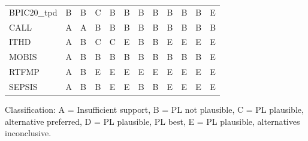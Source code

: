 \begin{tabular}{llllllllllll}
BPIC20\_tpd & \cellcolor[HTML]{D55E00} B & \cellcolor[HTML]{D55E00} B & \cellcolor[HTML]{E69F00} C & \cellcolor[HTML]{D55E00} B & \cellcolor[HTML]{D55E00} B & \cellcolor[HTML]{D55E00} B & \cellcolor[HTML]{D55E00} B & \cellcolor[HTML]{D55E00} B & \cellcolor[HTML]{D55E00} B & \cellcolor[HTML]{D55E00} B & \cellcolor[HTML]{56B4E9} E \\
       CALL & \cellcolor[HTML]{FFFFFF} A & \cellcolor[HTML]{FFFFFF} A & \cellcolor[HTML]{D55E00} B & \cellcolor[HTML]{D55E00} B & \cellcolor[HTML]{D55E00} B & \cellcolor[HTML]{D55E00} B & \cellcolor[HTML]{D55E00} B & \cellcolor[HTML]{D55E00} B & \cellcolor[HTML]{D55E00} B & \cellcolor[HTML]{D55E00} B & \cellcolor[HTML]{D55E00} B \\
       ITHD & \cellcolor[HTML]{FFFFFF} A & \cellcolor[HTML]{D55E00} B & \cellcolor[HTML]{E69F00} C & \cellcolor[HTML]{E69F00} C & \cellcolor[HTML]{56B4E9} E & \cellcolor[HTML]{D55E00} B & \cellcolor[HTML]{D55E00} B & \cellcolor[HTML]{56B4E9} E & \cellcolor[HTML]{56B4E9} E & \cellcolor[HTML]{56B4E9} E & \cellcolor[HTML]{56B4E9} E \\
      MOBIS & \cellcolor[HTML]{FFFFFF} A & \cellcolor[HTML]{D55E00} B & \cellcolor[HTML]{D55E00} B & \cellcolor[HTML]{D55E00} B & \cellcolor[HTML]{D55E00} B & \cellcolor[HTML]{D55E00} B & \cellcolor[HTML]{D55E00} B & \cellcolor[HTML]{D55E00} B & \cellcolor[HTML]{D55E00} B & \cellcolor[HTML]{D55E00} B & \cellcolor[HTML]{56B4E9} E \\
      RTFMP & \cellcolor[HTML]{FFFFFF} A & \cellcolor[HTML]{D55E00} B & \cellcolor[HTML]{56B4E9} E & \cellcolor[HTML]{56B4E9} E & \cellcolor[HTML]{56B4E9} E & \cellcolor[HTML]{56B4E9} E & \cellcolor[HTML]{56B4E9} E & \cellcolor[HTML]{56B4E9} E & \cellcolor[HTML]{56B4E9} E & \cellcolor[HTML]{56B4E9} E & \cellcolor[HTML]{56B4E9} E \\
     SEPSIS & \cellcolor[HTML]{FFFFFF} A & \cellcolor[HTML]{D55E00} B & \cellcolor[HTML]{D55E00} B & \cellcolor[HTML]{56B4E9} E & \cellcolor[HTML]{56B4E9} E & \cellcolor[HTML]{D55E00} B & \cellcolor[HTML]{D55E00} B & \cellcolor[HTML]{56B4E9} E & \cellcolor[HTML]{56B4E9} E & \cellcolor[HTML]{56B4E9} E & \cellcolor[HTML]{56B4E9} E \\
\bottomrule
\end{tabular}
\begin{center}\footnotesize
Classification: A = Insufficient support, B = PL not plausible, C = PL plausible, alternative preferred, D = PL plausible, PL best, E = PL plausible, alternatives inconclusive.
\end{center}
